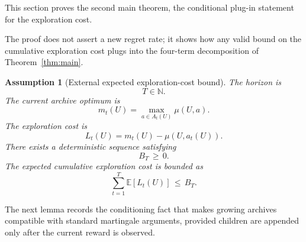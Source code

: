 \documentclass{article} %
\newtheorem{assumption}{Assumption}
\begin{document}
\label{app:proofs2}

This section proves the second main theorem, the conditional plug-in statement for the exploration cost.

The proof does not assert a new regret rate; it shows how any valid bound on the cumulative exploration cost plugs into the four-term decomposition of Theorem~\ref{thm:main}.

\begin{assumption}[External expected exploration-cost bound]
\label{ass:app-external-tax}
The horizon is
\begin{equation}
\label{eq:app-tax-horizon}
T\in \mathbb{N}.
\end{equation}
The current archive optimum is
\begin{equation}
\label{eq:app-tax-current-optimum}
m_t(U)
=
\max_{a\in A_t(U)}\mu(U,a).
\end{equation}
The exploration cost is
\begin{equation}
\label{eq:app-tax-definition}
L_t(U)
=
m_t(U)-\mu(U,a_t(U)).
\end{equation}
There exists a deterministic sequence satisfying
\begin{equation}
\label{eq:app-external-tax-bound}
B_T\,\ge\, 0.
\end{equation}
The expected cumulative exploration cost is bounded as
\begin{equation}
\label{eq:app-external-tax-assumption}
\sum_{t=1}^{T}\mathbb{E}[L_t(U)]
\,\le\,
B_T.
\end{equation}
\end{assumption}

The next lemma records the conditioning fact that makes growing archives compatible with standard martingale arguments, provided children are appended only after the current reward is observed.
\end{document}
